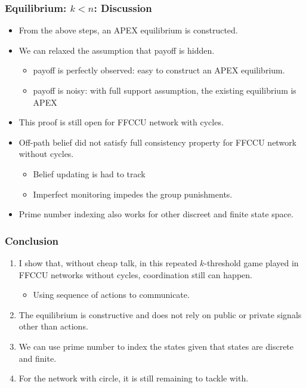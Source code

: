 \documentclass[10pt]{beamer}
\begin{document}
\begin{frame}
\frametitle{Equilibrium: $k<n$: Discussion}

\begin{itemize}
\item From the above steps, an APEX equilibrium is constructed.
\item We can relaxed the assumption that payoff is hidden.
\begin{itemize}
\item payoff is perfectly observed: easy to construct an APEX equilibrium.
\item payoff is noisy: with full support assumption, the existing equilibrium is APEX
\end{itemize}
\item This proof is still open for FFCCU network with cycles.
\item Off-path belief did not satisfy full consistency property for FFCCU network without cycles.
\begin{itemize}
\item Belief updating is had to track
\item Imperfect monitoring impedes the group punishments.
\end{itemize}
\item Prime number indexing also works for other discreet and finite state space.


\end{itemize}


\end{frame}




\begin{frame}

\frametitle{Conclusion}


\begin{enumerate}
\item I show that, without cheap talk, in this repeated $k$-threshold game played in FFCCU networks without cycles, coordination still can happen.
\begin{itemize}
\item Using sequence of actions to communicate.
\end{itemize}
\item The equilibrium is constructive and does not rely on public or private signals other than actions.
\item We can use prime number to index the states given that states are discrete and finite.
\item For the network with circle, it is still remaining to tackle with.
\end{enumerate}
\end{frame}
\end{document}
